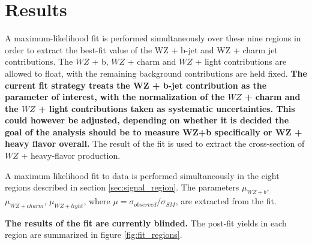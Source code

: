 \documentclass[NOTE, atlasdraft=true, texlive=2016, UKenglish]{\ATLASLATEXPATH atlasdoc}
\begin{document}
                                                                
\section{Results}
\label{sec:results}

A maximum-likelihood fit is performed simultaneously over these nine regions in order to extract the best-fit value of the WZ + b-jet and WZ + charm jet contributions. The $WZ$ + b, $WZ$ + charm and $WZ$ + light contributions are allowed to float, with the remaining background contributions are held fixed. \textbf{The current fit strategy treats the WZ + b-jet contribution as the parameter of interest, with the normalization of the $WZ$ + charm and the $WZ$ + light contributions taken as systematic uncertainties. This could however be adjusted, depending on whether it is decided the goal of the analysis should be to measure WZ+b specifically or WZ + heavy flavor overall.} The result of the fit is used to extract the cross-section of $WZ$ + heavy-flavor production.

A maximum likelihood fit to data is performed simultaneously in the eight regions described in section \ref{sec:signal_region}. The parameters $\mu_{WZ+b}$, $\mu_{WZ+charm}$, $\mu_{WZ+light}$, where $\mu = \sigma_{observed}/\sigma_{SM} $, are extracted from the fit.

\textbf{The results of the fit are currently blinded.} The post-fit yields in each region are summarized in figure \ref{fig:fit_regions}.
\end{document}
